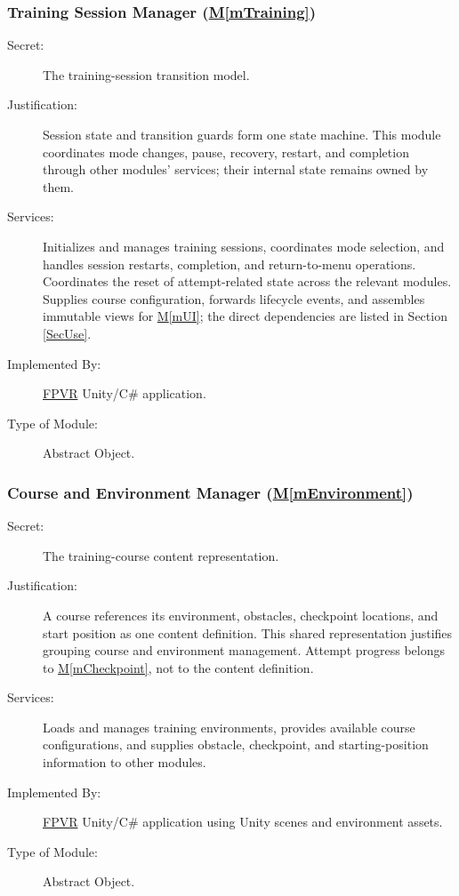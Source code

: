 \documentclass[12pt, titlepage]{article}
\DeclareRobustCommand{\mgabbr}[2]{\hyperlink{mg-abbr:#1}{#2}}
\newcommand{\mref}[1]{\hyperref[#1]{M\ref*{#1}}}
\begin{document}
\subsubsection{Training Session Manager (\mref{mTraining})}

\begin{description}

\item[Secret:]
The training-session transition model.

\item[Justification:]
Session state and transition guards form one state machine. This module
coordinates mode changes, pause, recovery, restart, and completion through
other modules' services; their internal state remains owned by them.

\item[Services:]
Initializes and manages training sessions, coordinates
mode selection, and handles session restarts, completion,
and return-to-menu operations. Coordinates the reset of
attempt-related state across the relevant modules. Supplies course
configuration, forwards lifecycle events, and assembles immutable views
for \mref{mUI}; the direct dependencies are listed in Section \ref{SecUse}.

\item[Implemented By:]
\mgabbr{fpvr}{FPVR} Unity/C\# application.

\item[Type of Module:]
Abstract Object.

\end{description}


\subsubsection{Course and Environment Manager (\mref{mEnvironment})}

\begin{description}

\item[Secret:]
The training-course content representation.

\item[Justification:]
A course references its environment, obstacles, checkpoint locations, and
start position as one content definition. This shared representation
justifies grouping course and environment management. Attempt progress
belongs to \mref{mCheckpoint}, not to the content definition.

\item[Services:]
Loads and manages training environments, provides
available course configurations, and supplies obstacle,
checkpoint, and starting-position information to
other modules.

\item[Implemented By:]
\mgabbr{fpvr}{FPVR} Unity/C\# application using Unity scenes and
environment assets.

\item[Type of Module:]
Abstract Object.

\end{description}
\end{document}
